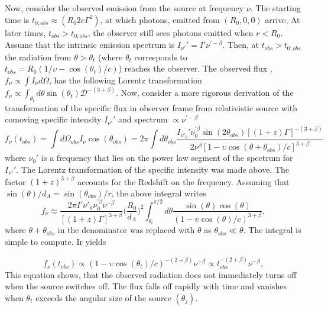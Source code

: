 Now, consider the observed emission from the source at frequency $\nu$. 
The starting time is $t_{0;obs}\approx(R_0 2 c \Gamma^2)$,  
at which photons, emitted from $(R_0, 0, 0)$ arrive, At later times, 
$t_{obs}>t_{0;obs}$, the observer still sees photons emitted when $r < R_0$. 
%
Assume that the intrinsic emission spectrum is $I_{\nu'}' = I'\nu^{'-\beta}$.
Then, at $t_{obs} > t_{0;obs}$ the radiation from $\theta > \theta_t$ 
(where $\theta_t$ corresponds to $t_{obs} = R_0 (1/\upsilon - \cos(\theta_t)/c)$) 
reaches the observer.
%
The observed flux \eg, $f_{\nu} \propto \int I_{\nu} d\Omega$, has the following 
Lorentz transformation 
$f_{\nu}\propto\int_{\theta_t} d\theta \sin(\theta_t) \mathcal{D}^{-(3+\beta)}$.
%
%
Now, consider a more rigorous derivation of the transformation of the specific 
flux in observer frame from relativistic source with comoving specific intensity 
$I_{\nu'}'$ and spectrum $\propto \nu^{' -\beta}$
%
\begin{equation}
f_{\nu}(t_{obs}) = \int d\Omega_{obs} I_{\nu} \cos(\theta_{obs}) = 2\pi \int d\theta_{obs} \frac{ I_{\nu'_0}' \nu_{0}^{'\beta}\sin(2\theta_{obs})[(1+z)\Gamma]^{-(3+\beta)} }{ 2\nu^{\beta} [ 1-\upsilon\cos(\theta + \theta_{obs}) / c ]^{3+\beta} }
\end{equation}
%
where $\nu_0 '$ is a frequency that lies on the power law segment of the spectrum for 
$I_{\nu'}'$. The Lorentz transformation of the specific intensity was made above. 
The factor $(1+z)^{3+\beta}$ accounts for the Redshift on the frequency. 
%
Assuming that $\sin(\theta)/d_{A} = \sin(\theta_{obs})/r$, the above integral writes 
%
\begin{equation}
f_{\nu} \approx \frac{ 2\pi I' \nu' _0 \nu_{0}^{'\beta}\nu^{-\beta} }{[(1+z)\Gamma]^{3+\beta}} \Big( \frac{R_0}{d_A} \Big)^2 \int_{\theta_t}^{\pi / 2} d\theta \frac{\sin(\theta)\cos(\theta)}{(1-\upsilon\cos(\theta)/c)^{3+\beta}},
\end{equation}
where $\theta+\theta_{obs}$ in the denominator was replaced with $\theta$ as $\theta_{obs}\ll\theta$.
The integral is simple to compute. Ir yields

\begin{equation}
f_{\nu}(t_{obs}) \propto (1 - \upsilon\cos(\theta_t)/c)^{-(2 + \beta)}\nu^{-\beta} \propto t_{obs}^{-(2+\beta)} \nu^{-\beta},
\end{equation}
%
This equation shows, that the observed radiation does not immediately turns off 
when the source switches off. The flux falls off rapidly with time and vanishes 
when $\theta_t$ exceeds the angular size of the source $(\theta_j)$.




